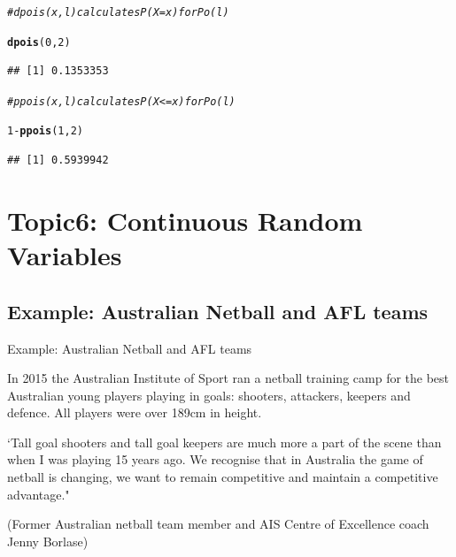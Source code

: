 \documentclass[t,xcolor=pdftex,dvipsnames,table]{beamer}\usepackage[]{graphicx}\usepackage[]{color}
\makeatletter
\newcommand{\hlnum}[1]{\textcolor[rgb]{0.686,0.059,0.569}{#1}}%
\newcommand{\hlcom}[1]{\textcolor[rgb]{0.678,0.584,0.686}{\textit{#1}}}%
\newcommand{\hlopt}[1]{\textcolor[rgb]{0,0,0}{#1}}%
\newcommand{\hlstd}[1]{\textcolor[rgb]{0.345,0.345,0.345}{#1}}%
\newcommand{\hlkwd}[1]{\textcolor[rgb]{0.737,0.353,0.396}{\textbf{#1}}}%
\newenvironment{kframe}{%
 \def\at@end@of@kframe{}%
 \ifinner\ifhmode%
  \def\at@end@of@kframe{\end{minipage}}%
  \begin{minipage}{\columnwidth}%
 \fi\fi%
 \def\FrameCommand##1{\hskip\@totalleftmargin \hskip-\fboxsep
 \colorbox{shadecolor}{##1}\hskip-\fboxsep
     \hskip-\linewidth \hskip-\@totalleftmargin \hskip\columnwidth}%
 \MakeFramed {\advance\hsize-\width
   \@totalleftmargin\z@ \linewidth\hsize
   \@setminipage}}%
 {\par\unskip\endMakeFramed%
 \at@end@of@kframe}
\newenvironment{knitrout}{}{} %
\makeatother
\begin{document}
\begin{frame}[fragile]\frametitle{}
\begin{knitrout}
\color{fgcolor}\begin{kframe}
\begin{alltt}
\hlcom{# dpois(x,l) calculates P(X=x) for Po(l)}

\hlkwd{dpois}\hlstd{(}\hlnum{0}\hlstd{,}\hlnum{2}\hlstd{)}
\end{alltt}
\begin{verbatim}
## [1] 0.1353353
\end{verbatim}
\end{kframe}
\end{knitrout}

\begin{knitrout}
\color{fgcolor}\begin{kframe}
\begin{alltt}
\hlcom{# ppois(x,l) calculates P(X<=x) for Po(l)}

\hlnum{1}\hlopt{-}\hlkwd{ppois}\hlstd{(}\hlnum{1}\hlstd{,}\hlnum{2}\hlstd{)}
\end{alltt}
\begin{verbatim}
## [1] 0.5939942
\end{verbatim}
\end{kframe}
\end{knitrout}
\end{frame}

  




\section[6]{Topic6: Continuous Random Variables}
\subsection[Example]{Example: Australian Netball and AFL teams}
\begin{frame}{Example: Australian Netball and AFL teams}

In 2015 the Australian Institute of Sport ran a netball training camp for the best Australian young players playing in goals: shooters, attackers, keepers and defence. All players were over 189cm in height.  

\vspace{.5cm}
`Tall goal shooters and tall goal keepers are much more a part of the scene than when I was playing 15 years ago. We recognise that in Australia the game of netball is changing, we want to remain competitive and maintain a competitive advantage."

(Former Australian netball team member and AIS Centre of Excellence coach Jenny Borlase)
\href{http://www.abc.net.au/news/2015-06-14/tall-athletes-get-support-at-ais-to-stand-as-proud-netballers/6544642}{}
\end{frame}
\end{document}

